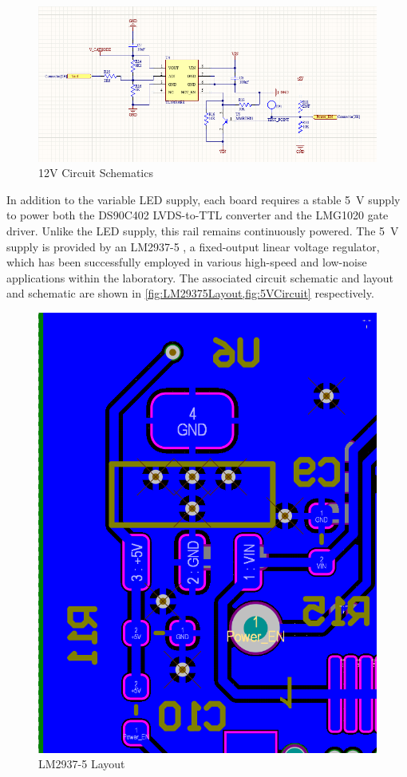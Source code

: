 \documentclass[a4paper,11pt]{article}
\begin{document}
\begin{figure}[h]
\centering
\includegraphics[scale=0.7]{12VVariablePSU.png}
\caption{12V Circuit Schematics\label{fig:12VVariablePSU}}
\end{figure}

In addition to the variable LED supply, each board requires a stable 5~V supply to power both the DS90C402 LVDS-to-TTL converter and the LMG1020 gate driver. Unlike the LED supply, this rail remains continuously powered. The 5~V supply is provided by an LM2937-5 \cite{LM2347-5}, a fixed-output linear voltage regulator, which has been successfully employed in various high-speed and low-noise applications within the laboratory. The associated circuit schematic and layout and schematic are shown in \cref{fig:LM29375Layout,fig:5VCircuit} respectively.

\begin{figure}[h!]
\centering
\includegraphics[scale=0.5]{LM29375Layout.png}
\caption{LM2937-5 Layout\label{fig:LM29375Layout}}
\end{figure}
\end{document}
